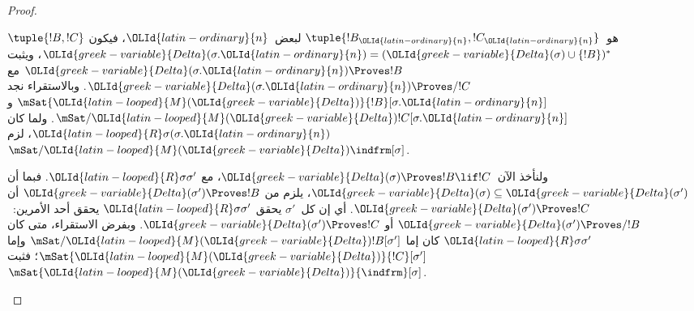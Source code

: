 \documentclass[../../../include/open-logic-section]{subfiles}
\begin{document}
\begin{proof}
\begin{enumerate}
{      $\tuple{!B, !C}$ هو~$\tuple{!B_\OLId{latin-ordinary}{n}, !C_\OLId{latin-ordinary}{n}}$ لبعض~$\OLId{latin-ordinary}{n}$، فيكون
      $\OLId{greek-variable}{Delta}(\sigma.\OLId{latin-ordinary}{n}) = (\OLId{greek-variable}{Delta}(\sigma) \cup \{!B\})^*$، ويثبت
      $\OLId{greek-variable}{Delta}(\sigma.\OLId{latin-ordinary}{n}) \Proves !B$ مع
      $\OLId{greek-variable}{Delta}(\sigma.\OLId{latin-ordinary}{n}) \Proves/ !C$. وبالاستقراء نجد
      $\mSat{\OLId{latin-looped}{M}(\OLId{greek-variable}{Delta})}{!B}[\sigma.\OLId{latin-ordinary}{n}]$ و
      $\mSat/{\OLId{latin-looped}{M}(\OLId{greek-variable}{Delta})}{!C}[\sigma.\OLId{latin-ordinary}{n}]$. ولما كان
      $\OLId{latin-looped}{R}\sigma(\sigma.\OLId{latin-ordinary}{n})$، لزم
      $\mSat/{\OLId{latin-looped}{M}(\OLId{greek-variable}{Delta})}{\indfrm}[\sigma]$.

      ولنأخذ الآن~$\OLId{greek-variable}{Delta}(\sigma) \Proves !B \lif !C$، مع
      $\OLId{latin-looped}{R}\sigma\sigma'$. فبما أن
      $\OLId{greek-variable}{Delta}(\sigma) \subseteq \OLId{greek-variable}{Delta}(\sigma')$، يلزم من
      $\OLId{greek-variable}{Delta}(\sigma') \Proves !B$ أن
      $\OLId{greek-variable}{Delta}(\sigma') \Proves !C$. أي إن كل~$\sigma'$ يحقق
      $\OLId{latin-looped}{R}\sigma\sigma'$ يحقق أحد الأمرين:~$\OLId{greek-variable}{Delta}(\sigma') \Proves/ !B$ أو
      $\OLId{greek-variable}{Delta}(\sigma') \Proves !C$. وبفرض الاستقراء، متى كان
      $\OLId{latin-looped}{R}\sigma\sigma'$ كان إما
      $\mSat/{\OLId{latin-looped}{M}(\OLId{greek-variable}{Delta})}{!B}[\sigma']$ وإما
      $\mSat{\OLId{latin-looped}{M}(\OLId{greek-variable}{Delta})}{!C}[\sigma']$؛ فثبت
      $\mSat{\OLId{latin-looped}{M}(\OLId{greek-variable}{Delta})}{\indfrm}[\sigma]$.}
  \end{enumerate}
\end{proof}
\end{document}
